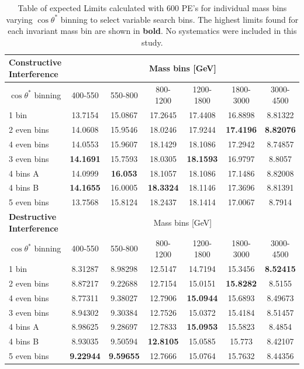     \begin {table}[h!]
        \small 
        \begin{center}
        \begin{tabular}{ |l|c|c|c|c|c|c| } 
            \hline
            \hline
            {\bf Constructive Interference} & \multicolumn{6}{c|}{Mass bins [GeV]} \\ 
            \hline
            $\cos{\theta^{*}}$ binning & 400-550 & 550-800 & 800-1200 & 1200-1800 & 1800-3000 & 3000-4500 \\
            \hline
            1 bin       & 13.7154 & 15.0867 & 17.2645 & 17.4408 & 16.8898 & 8.81322 \\
            2 even bins & 14.0608 & 15.9546 & 18.0246 & 17.9244 & {\bf17.4196} & {\bf8.82076} \\
            4 even bins & 14.0553 & 15.9607 & 18.1429 & 18.1086 & 17.2942 & 8.74857 \\
            3 even bins & {\bf14.1691} & 15.7593 & 18.0305 & {\bf18.1593} & 16.9797 & 8.8057 \\
            4 bins A    & 14.0999 & {\bf16.053}  & 18.1057 & 18.1086 & 17.1486 & 8.82008 \\
            4 bins B    & {\bf14.1655} & 16.0005 & {\bf18.3324} & 18.1146 & 17.3696 & 8.81391 \\
            5 even bins & 13.7568 & 15.8124 & 18.2437 & 18.1414 & 17.0067 & 8.7914 \\
            \hline
            \hline
            {\bf Destructive Interference} & \multicolumn{6}{c|}{Mass bins [GeV]} \\
            \hline
            $\cos{\theta^{*}}$ binning & 400-550 & 550-800 & 800-1200 & 1200-1800 & 1800-3000 & 3000-4500 \\
            \hline
            1 bin       & 8.31287 & 8.98298 & 12.5147 & 14.7194 & 15.3456 & {\bf8.52415} \\
            2 even bins & 8.87217 & 9.22688 & 12.7154 & 15.0151 & {\bf15.8282} & 8.5155 \\
            4 even bins & 8.77311 & 9.38027 & 12.7906 & {\bf15.0944} & 15.6893 & 8.49673 \\
            3 even bins & 8.94302 & 9.30384 & 12.7526 & 15.0372 & 15.4184 & 8.51457 \\
            4 bins A    & 8.98625 & 9.28697 & 12.7833 & {\bf15.0953} & 15.5823 & 8.4854 \\
            4 bins B    & 8.93035 & 9.50594 & {\bf12.8105} & 15.0585 & 15.773 & 8.42107 \\
            5 even bins & {\bf9.22944} & {\bf9.59655} & 12.7666 & 15.0764 & 15.7632 & 8.44356 \\
            \hline
            \hline
        \end{tabular}
        \caption{Table of expected Limits calculated with 600 PE's for individual mass bins varying $\cos{\theta^{*}}$ binning to select variable search bins. The highest limits found for each invariant mass bin are shown in {\bf bold}. No systematics were included in this study.}
        \label{tab:limits_binOpp}
        \end{center}
    \end {table}


